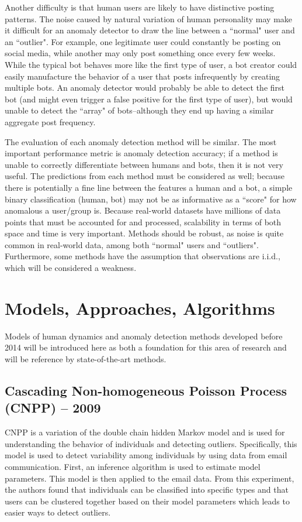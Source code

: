\documentclass[11pt, oneside]{article}   	%
\begin{document}
\quad Another difficulty is that human users are likely to have distinctive posting patterns.
The noise caused by natural variation of human personality may make it difficult for an anomaly detector to draw the line between a ``normal" user and an ``outlier".
For example, one legitimate user could constantly be posting on social media, while another may only post something once every few weeks.
While the typical bot behaves more like the first type of user, a bot creator could easily manufacture the behavior of a user that posts infrequently by creating multiple bots.
An anomaly detector would probably be able to detect the first bot (and might even trigger a false positive for the first type of user), but would unable to detect the ``array" of bots--although they end up having a similar aggregate post frequency.

\quad The evaluation of each anomaly detection method will be similar.
The most important performance metric is anomaly detection accuracy; if a method is unable to correctly differentiate between humans and bots, then it is not very useful.
The predictions from each method must be considered as well; because there is potentially a fine line between the features a human and a bot, a simple binary classification (human, bot) may not be as informative as a ``score" for how anomalous a user/group is.
Because real-world datasets have millions of data points that must be accounted for and processed, scalability in terms of both space and time is very important.
Methods should be robust, as noise is quite common in real-world data, among both ``normal" users and ``outliers".
Furthermore, some methods have the assumption that observations are i.i.d., which will be considered a weakness.

\section*{Models, Approaches, Algorithms}

\quad Models of human dynamics and anomaly detection methods  developed before 2014 will be introduced here as both a foundation for this area of research and will be reference by state-of-the-art methods. 

\subsection*{Cascading Non-homogeneous Poisson Process (CNPP) -- 2009}

\quad CNPP is a variation of the double chain hidden Markov model and is used for understanding the behavior of individuals and detecting outliers.
Specifically, this model is used to detect variability among individuals by using data from email communication.
First, an inference algorithm is used to estimate model parameters. 
This model is then applied to the email data.
From this experiment, the authors found that individuals can be classified into specific types and that users can be clustered together based on their model parameters which leads to easier ways to detect outliers.
\end{document}
